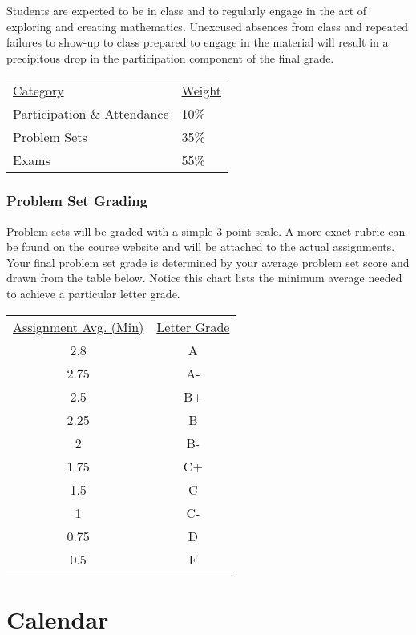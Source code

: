 \documentclass[nobib]{tufte-handout}
\begin{document}
Students are expected to be in class and to regularly engage in the act of exploring and creating mathematics. Unexcused absences from class and repeated failures to show-up to class prepared to engage in the material will result in a precipitous drop in the participation component of the final grade.

\begin{center}
\begin{tabular}{ll}
\underline{Category} & \underline{Weight}  \\
Participation \& Attendance & 10\% \\
Problem Sets & 35\% \\
Exams & 55\%
\end{tabular}
\end{center}

\subsubsection{Problem Set Grading}

Problem sets will be graded with a simple 3 point scale. A more exact rubric can be found on the course website and will be attached to the actual assignments. Your final problem set grade is determined by your average problem set score and drawn from the table below. Notice this chart lists the minimum average needed to achieve a particular letter grade.

\begin{center}
\begin{small}
\begin{tabular}{cc}
\underline{Assignment Avg. (Min)} & \underline{Letter Grade} \\
2.8   & A  \\
2.75    & A- \\
2.5 & B+ \\
2.25    & B  \\
2   & B- \\
1.75    & C+ \\
1.5 & C  \\
1   & C- \\
0.75    & D  \\
0.5  & F
\end{tabular}
\end{small}
\end{center}

\section{Calendar}
\end{document}
